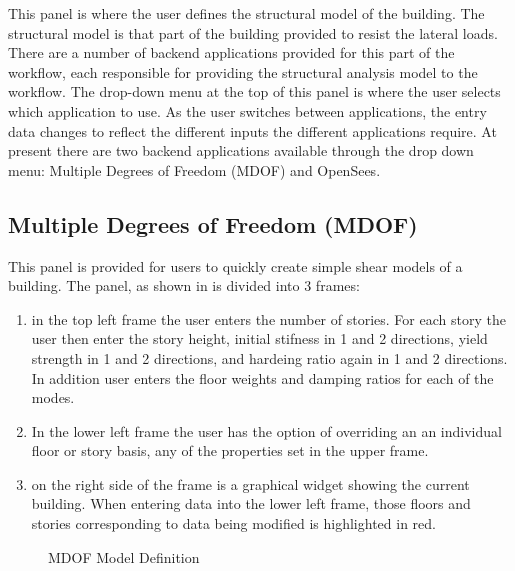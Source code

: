 This panel is where the user defines the structural model of the
building. The structural model is that part of the building provided
to resist the lateral loads. There are a number of backend
applications provided for this part of the workflow, each responsible
for providing the structural analysis model to the workflow. The
drop-down menu at the top of this panel is where the user selects
which application to use. As the user switches between applications,
the entry data changes to reflect the different inputs the different
applications require. At present there are two backend applications
available through the drop down menu: Multiple Degrees of Freedom
(MDOF) and OpenSees.

\subsection{Multiple Degrees of Freedom (MDOF)}

This panel is provided for users to quickly create simple shear models
of a building. The panel, as shown in  is divided
into 3 frames:
\begin{enumerate}
\item in the top left frame the user enters the number of stories. For
  each story the user then enter the story height, initial stifness in
  1 and 2 directions, yield strength in 1 and 2 directions, and
  hardeing ratio again in 1 and 2 directions. In addition user enters
  the floor weights and damping ratios for each of the modes.
\item In the lower left frame the user has the option of overriding an
  an individual floor or story basis, any of the properties set in the
  upper frame.
\item on the right side of the frame is a graphical widget showing the
  current building. When entering data into the lower left frame,
  those floors and stories corresponding to data being modified is
  highlighted in red.
\end{enumerate}

\begin{figure}[!htbp]
  \caption{MDOF Model Definition}
  \label{fig:mdof}
\end{figure}

